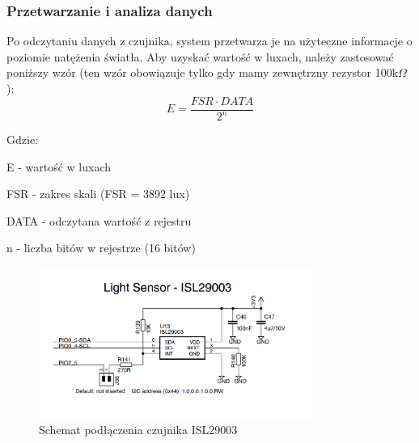     \subsubsection{Przetwarzanie i analiza danych}
    Po odczytaniu danych z czujnika, system przetwarza je na użyteczne informacje o poziomie natężenia światła. Aby uzyskać wartość w luxach, należy zastosować poniższy wzór (ten wzór obowiązuje tylko gdy mamy zewnętrzny rezystor 100k$\Omega$):
    \begin{equation}
        E = \frac{FSR \cdot DATA}{2^{n}}
    \end{equation}

    Gdzie:
    
    \quad E - wartość w luxach 

    \quad FSR - zakres skali (FSR = 3892 lux) 

    \quad DATA - odczytana wartość z rejestru

    \quad n - liczba bitów w rejestrze (16 bitów)
   


    \begin{figure}[H]
        \centering
        \includegraphics[width=0.8\textwidth]{../ISL29003/schemat.png}
        \caption{Schemat podłączenia czujnika ISL29003}
        \label{fig:czujnik_swiatla}
    \end{figure}
